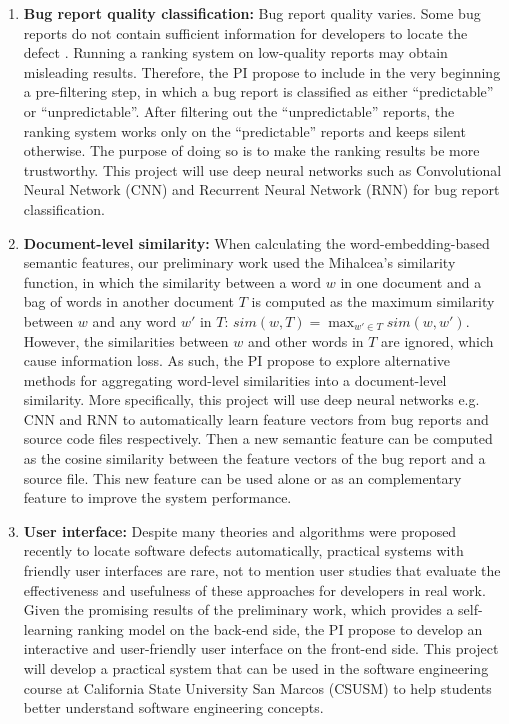 \begin{enumerate}
  \item \textbf{Bug report quality classification:} Bug report quality varies. Some bug reports do not contain sufficient information for developers to locate the defect \cite{Breu:2010:INB:1718918.1718973}. Running a ranking system on low-quality reports may obtain misleading results. Therefore, the PI propose to include in the very beginning a pre-filtering step, in which a bug report is classified as either ``predictable'' or ``unpredictable''. After filtering out the ``unpredictable'' reports, the ranking system works only on the ``predictable'' reports and keeps silent otherwise. The purpose of doing so is to make the ranking results be more trustworthy. This project will use deep neural networks such as Convolutional Neural Network (CNN) \cite{LeCun:1989:BAH:1351079.1351090} and Recurrent Neural Network (RNN) \cite{Hochreiter:1997:LSM:1246443.1246450} for bug report classification.
  \item \textbf{Document-level similarity:} When calculating the word-embedding-based semantic features, our preliminary work used the Mihalcea's \cite{mihalcea:aaai06} similarity function, in which the similarity between a word $w$ in one document and a bag of words in another document $T$ is computed as the maximum similarity between $w$ and any word $w'$ in $T$: $sim(w, T) = \max_{w' \in T} sim(w, w')$. However, the similarities between $w$ and other words in $T$ are ignored, which cause information loss. As such, the PI propose to explore alternative methods for aggregating word-level similarities into a document-level similarity. More specifically, this project will use deep neural networks e.g. CNN and RNN to automatically learn feature vectors from bug reports and source code files respectively. Then a new semantic feature can be computed as the cosine similarity between the feature vectors of the bug report and a source file. This new feature can be used alone or as an complementary feature to improve the system performance.
  \item \textbf{User interface:} Despite many theories and algorithms were proposed recently to locate software defects automatically, practical systems with friendly user interfaces are rare, not to mention user studies that evaluate the effectiveness and usefulness of these approaches for developers in real work. Given the promising results of the preliminary work, which provides a self-learning ranking model on the back-end side, the PI propose to develop an interactive and user-friendly user interface on the front-end side. This project will develop a practical system that can be used in the software engineering course at California State University San Marcos (CSUSM) to help students better understand software engineering concepts.
\end{enumerate}

